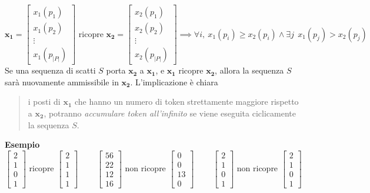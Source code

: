 \documentclass[10pt, letterpaper]{report}
\begin{document}
$$ \mathbf{x_1}=\begin{bmatrix}
    x_1(p_1)\\ x_1(p_2)\\\vdots \\x_1(p_{|P|})
\end{bmatrix} \text{ ricopre } \mathbf{x_2}=\begin{bmatrix}
    x_2(p_1)\\ x_2(p_2)\\\vdots \\x_2(p_{|P|})
\end{bmatrix} \implies \forall i, \ x_1(p_i)\ge x_2(p_i)\land \exists j \ \ x_1(p_j)> x_2(p_j)$$
Se una sequenza di scatti $S$ porta $\mathbf{x_2}$ a $\mathbf{x_1}$, e  
$\mathbf{x_1}$ ricopre $\mathbf{x_2}$, allora la sequenza $S$ sarà nuovamente ammissibile in $\mathbf{x_2}$. L'implicazione è chiara \begin{quotation}
    i posti di $\mathbf{x_1}$ che hanno un numero di token strettamente maggiore rispetto a  $\mathbf{x_2}$, potranno \textit{accumulare token all'infinito} se viene eseguita ciclicamente la sequenza $S$.
\end{quotation}
\textbf{Esempio}
$$\begin{bmatrix}
    2 \\ 1 \\ 0 \\ 1
\end{bmatrix} \text{ ricopre } 
\begin{bmatrix}
    2 \\ 1 \\ 1 \\ 1
\end{bmatrix} \ \ \ \ \  \ \ \ \ \  
\begin{bmatrix}
    56 \\ 22 \\ 12 \\ 16
\end{bmatrix} \text{ non ricopre } 
\begin{bmatrix}
    0 \\ 0 \\ 13 \\ 0
\end{bmatrix}  \ \ \ \ \    \ \ \ \ \  
\begin{bmatrix}
    2 \\ 1 \\ 0 \\ 1
\end{bmatrix} \text{ non ricopre } 
\begin{bmatrix}
    2 \\ 1 \\ 0 \\ 1
\end{bmatrix}
$$
\end{document}
